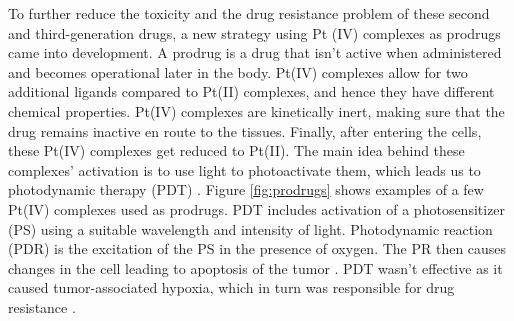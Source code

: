 \hspace{0.1cm}To further reduce the toxicity and the drug resistance problem of these second and third-generation drugs, a new strategy using Pt (IV) complexes as prodrugs came into development. A prodrug is a drug that isn't active when administered and becomes operational later in the body. Pt(IV) complexes allow for two additional ligands compared to Pt(II) complexes, and hence they have different chemical properties. Pt(IV) complexes are kinetically inert, making sure that the drug remains inactive en route to the tissues. Finally, after entering the cells, these Pt(IV) complexes get reduced to Pt(II). The main idea behind these complexes' activation is to use light to photoactivate them, which leads us to photodynamic therapy (PDT) \cite{dilruba2016platinum}. Figure \ref{fig:prodrugs} shows examples of a few Pt(IV) complexes used as prodrugs. PDT includes activation of a photosensitizer (PS) using a suitable wavelength and intensity of light. Photodynamic reaction (PDR) is the excitation of the PS in the presence of oxygen. The PR then causes changes in the cell leading to apoptosis of the tumor \cite{allison2013photodynamic}. PDT wasn't effective as it caused tumor-associated hypoxia, which in turn was responsible for drug resistance \cite{liu2017chemical}.


